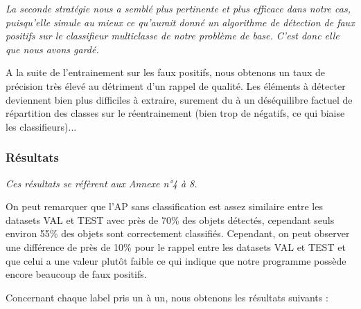 \documentclass[a4paper,11pt]{article}
\begin{document}
\vspace{2mm}

\noindent \textit{La seconde stratégie nous a semblé plus pertinente et plus efficace dans notre cas, puisqu'elle simule au mieux ce qu'aurait donné un algorithme de détection de faux positifs sur le classifieur multiclasse de notre problème de base. C'est donc elle que nous avons gardé.}

\vspace{2mm}

A la suite de l'entrainement sur les faux positifs, nous obtenons un taux de précision très élevé au détriment d'un rappel de qualité. Les éléments à détecter deviennent bien plus difficiles à extraire, surement du à un déséquilibre factuel de répartition des classes sur le réentrainement (bien trop de négatifs, ce qui biaise les classifieurs)...

\subsubsection{Résultats}

\textit{Ces résultats se réfèrent aux Annexe n°4 à 8.}

\vspace{2mm}

\noindent On peut remarquer que l'AP sans classification est assez similaire entre les datasets VAL et TEST avec près de 70\% des objets détectés, cependant seuls environ 55\% des objets sont correctement classifiés. Cependant, on peut observer une différence de près de 10\% pour le rappel entre les datasets VAL et TEST et que celui a une valeur plutôt faible ce qui indique que notre programme possède encore beaucoup de faux positifs.

\vspace{2mm}

\noindent Concernant chaque label pris un à un, nous obtenons les résultats suivants :
\end{document}
